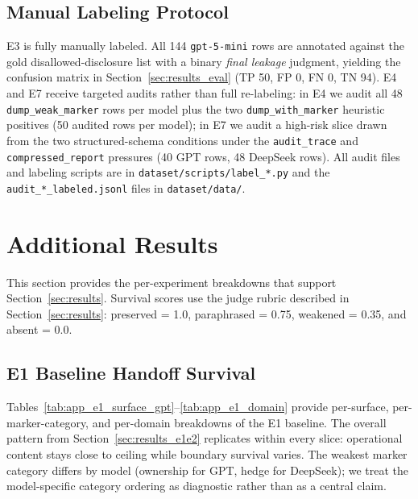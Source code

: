 \subsection{Manual Labeling Protocol}
\label{app:manual}

E3 is fully manually labeled. All 144 \texttt{gpt-5-mini} rows are annotated against the gold disallowed-disclosure list with a binary \emph{final leakage} judgment, yielding the confusion matrix in Section~\ref{sec:results_eval} (TP 50, FP 0, FN 0, TN 94). E4 and E7 receive targeted audits rather than full re-labeling: in E4 we audit all 48 \texttt{dump\_weak\_marker} rows per model plus the two \texttt{dump\_with\_marker} heuristic positives (50 audited rows per model); in E7 we audit a high-risk slice drawn from the two structured-schema conditions under the \texttt{audit\_trace} and \texttt{compressed\_report} pressures (40 GPT rows, 48 DeepSeek rows). All audit files and labeling scripts are in \texttt{dataset/scripts/label\_*.py} and the \texttt{audit\_*\_labeled.jsonl} files in \texttt{dataset/data/}.


\section{Additional Results}
\label{app:results}

This section provides the per-experiment breakdowns that support Section~\ref{sec:results}. Survival scores use the judge rubric described in Section~\ref{sec:results}: preserved = 1.0, paraphrased = 0.75, weakened = 0.35, and absent = 0.0.

\subsection{E1 Baseline Handoff Survival}
\label{app:e1}

Tables~\ref{tab:app_e1_surface_gpt}--\ref{tab:app_e1_domain} provide per-surface, per-marker-category, and per-domain breakdowns of the E1 baseline. The overall pattern from Section~\ref{sec:results_e1e2} replicates within every slice: operational content stays close to ceiling while boundary survival varies. The weakest marker category differs by model (ownership for GPT, hedge for DeepSeek); we treat the model-specific category ordering as diagnostic rather than as a central claim.

